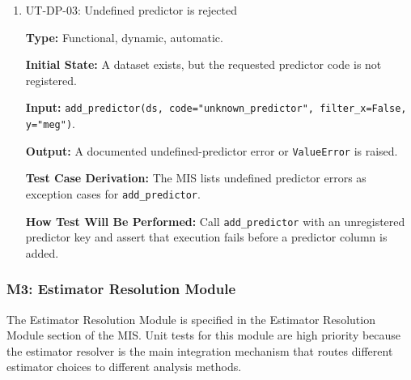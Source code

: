 \documentclass[12pt, titlepage]{article}
\begin{document}
\begin{enumerate}
\item{UT-DP-03: Undefined predictor is rejected\\}

\textbf{Type:} Functional, dynamic, automatic.

\textbf{Initial State:} A dataset exists, but the requested predictor code is not registered.

\textbf{Input:} \texttt{add\_predictor(ds, code="unknown\_predictor", filter\_x=False, y="meg")}.

\textbf{Output:} A documented undefined-predictor error or \texttt{ValueError} is raised.

\textbf{Test Case Derivation:} The MIS lists undefined predictor errors as exception cases for \texttt{add\_predictor}.

\textbf{How Test Will Be Performed:} Call \texttt{add\_predictor} with an unregistered predictor key and assert that execution fails before a predictor column is added.

\end{enumerate}

\subsubsection{M3: Estimator Resolution Module}

The Estimator Resolution Module is specified in the Estimator Resolution Module section of the MIS. Unit tests for this module are high priority because the estimator resolver is the main integration mechanism that routes different estimator choices to different analysis methods.
\end{document}
